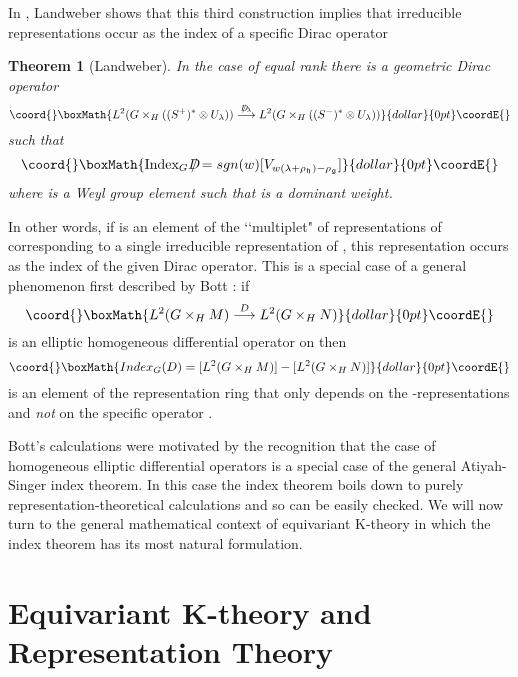 \documentclass[a4paper,a4paper]{article}
\newtheorem{theorem}{Theorem}
\theoremstyle{conjecture}
\def\Slash#1{#1\!\!\!\!/}
\def\Dirac{\Slash D}
\begin{document}
In \cite{Landweber1}, Landweber shows that this third construction implies
that irreducible \coordHE{} representations occur as the index of a specific
Dirac operator

\begin{theorem}[Landweber]
In the case \coordHE{} of equal rank there is a geometric Dirac operator
$$\coord{}\boxMath{L^2(G\times_H((S^+)^*\otimes U_\lambda))\stackrel{\Dirac_\lambda}\longrightarrow
L^2(G\times_H((S^-)^*\otimes U_\lambda))}{dollar}{0pt}\coordE{}$$
such that
$$\coord{}\boxMath{\text{Index}_G \Dirac = sgn(w) [V_{w(\lambda +\rho_\mathfrak h)-\rho_\mathfrak g}]}{dollar}{0pt}\coordE{}$$
where \coordHE{} is a Weyl group element such that \coordHE{} is
a dominant weight.
\end{theorem}

In other words, if \coordHE{} is an element of the \lq\lq multiplet" of representations
of \coordHE{} corresponding to a single irreducible representation of \coordHE{}, this \coordHE{}
representation occurs as the index of the given Dirac operator.  This is a special
case of a general phenomenon first described by Bott \cite{Bott2}: if
$$\coord{}\boxMath{L^2(G\times_H M)\stackrel{D}\longrightarrow L^2(G\times_H N)}{dollar}{0pt}\coordE{}$$
is an elliptic homogeneous differential operator on \coordHE{} then
$$\coord{}\boxMath{Index_G(D)=[L^2(G\times_H M)]-[L^2(G\times_H N)]}{dollar}{0pt}\coordE{}$$
is an element of the representation ring \coordHE{} that only depends on the
\coordHE{}-representations \coordHE{} and \coordHE{} {\it{not}} on the specific operator \coordHE{}.

Bott's calculations were motivated by the recognition that the case
of homogeneous elliptic differential operators is a special case
of the general Atiyah-Singer index theorem.  In this case the index
theorem boils down to purely representation-theoretical calculations
and so can be easily checked.  We will now turn to the general
mathematical context of equivariant K-theory in which the index
theorem has its most natural formulation.


\section{Equivariant K-theory and Representation Theory}
\end{document}
